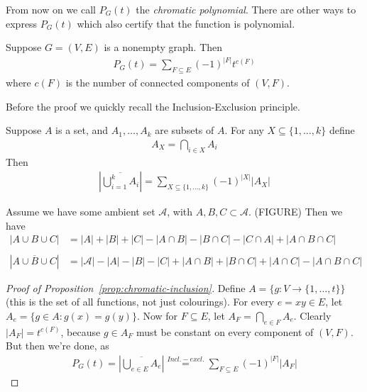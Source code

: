 From now on we call $P_G(t)$ the \emph{chromatic polynomial}. There are other ways to express $P_G(t)$ which also certify that the function is polynomial.

\begin{proposition}
\label{prop:chromatic-inclusion}
Suppose $G=(V,E)$ is a nonempty graph. Then
\begin{align*}
P_G(t)=\sum_{F\subseteq E} (-1)^{|F|} t^{c(F)}
\end{align*}
where $c(F)$ is the number of connected components of $(V,F)$.
\end{proposition}

Before the proof we quickly recall the Inclusion-Exclusion principle.

\begin{fact}
Suppose $A$ is a set, and $A_1,\dots, A_k$ are subsets of $A$. For any $X\subseteq \lbrace 1,\dots , k\rbrace$ define
\begin{align*}
A_X=\bigcap_{i\in X} A_i
\end{align*}
Then
\begin{align*}
\left| \overline{\bigcup_{i=1}^k A_i}\right| = \sum_{X\subseteq \lbrace 1,\dots , k\rbrace} (-1)^{|X|}|A_X|
\end{align*}
\end{fact}

\begin{example} Assume we have some ambient set $\mathcal{A}$, with  $A,B,C \subset \mathcal{A}$. (FIGURE)
Then we have
\begin{align*}
|A\cup B \cup C| &= |A|+|B|+|C| -|A\cap B|-|B\cap C|-|C\cap A| + |A\cap B\cap C|\\\\
|\overline{A\cup B\cup C}|&= |\mathcal{A} | - |A|-|B|-|C| +|A\cap B|+|B\cap C|+|A\cap C| -|A\cap B\cap C|
\end{align*}
\end{example}

\begin{proof}[Proof of Proposition~\ref{prop:chromatic-inclusion}]
Define $A=\lbrace g:V\to \lbrace 1,\dots ,t\rbrace\rbrace$ (this is the set of all functions, not just colourings). For every $e=xy\in E$, let $A_e=\lbrace g\in A : g(x)=g(y)\rbrace$. Now for $F\subseteq E$, let $A_F= \bigcap_{e\in F} A_e$. Clearly $|A_F|=t^{c(F)}$, because $g\in A_F$ must be constant on every component of $(V,F)$. But then we're done, as 
\begin{align*}
P_G(t)= \left| \overline{\bigcup_{e\in E} A_e}\right| \overset{Incl.-excl.}{=} \sum_{F\subseteq E} (-1)^{|F|} |A_F|
\end{align*}
\end{proof}

